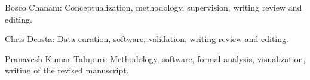 Bosco Chanam: Conceptualization, methodology, supervision, writing review and editing.

Chris Dcosta: Data curation, software, validation, writing review and editing.

Pranavesh Kumar Talupuri: Methodology, software, formal analysis, visualization, writing of the revised manuscript.
